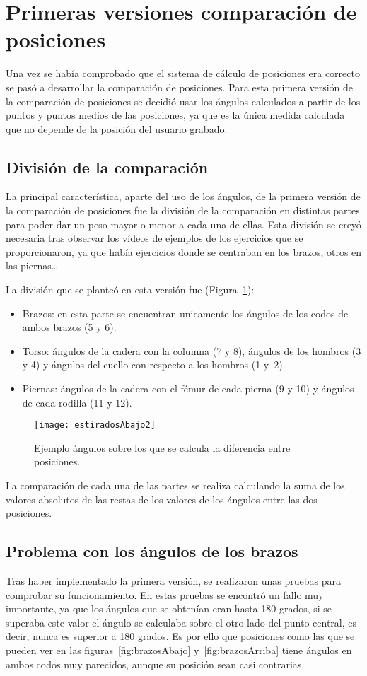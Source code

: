 {\section{Primeras versiones comparación de posiciones} \label{PrimeraVersion}
Una vez se había comprobado que el sistema de cálculo de posiciones era correcto se pasó a desarrollar la comparación de posiciones. Para esta primera versión de la comparación de posiciones se decidió usar los ángulos calculados a partir de los puntos y puntos medios de las posiciones, ya que es la única medida calculada que no depende de la posición del usuario grabado.
\subsection{División de la comparación}
La principal característica, aparte del uso de los ángulos, de la primera versión de la comparación de posiciones fue la división de la comparación en distintas partes para poder dar un peso mayor o menor a cada una de ellas. Esta división se creyó necesaria tras observar los vídeos de ejemplos de los ejercicios que se proporcionaron, ya que había ejercicios donde se centraban en los brazos, otros en las piernas\ldots

La división que se planteó en esta versión fue (Figura~\ref{fig:estiradosAbajo2}):
\begin{itemize}
	\item Brazos: en esta parte se encuentran unicamente los ángulos de los codos de ambos brazos (5 y 6).
	\item Torso: ángulos de la cadera con la columna (7 y 8), ángulos de los hombros (3 y 4) y ángulos del cuello con respecto a los hombros (1 y~2).
	\item Piernas: ángulos de la cadera con el fémur de cada pierna (9 y 10) y ángulos de cada rodilla (11 y 12).
\end{itemize}

\begin{figure}[h]
	\centering
	\texttt{[image: estiradosAbajo2]}
	\caption{Ejemplo ángulos sobre los que se calcula la diferencia entre posiciones.}
	\label{fig:estiradosAbajo2}
\end{figure}

La comparación de cada una de las partes se realiza calculando la suma de los valores absolutos de las restas de los valores de los ángulos entre las dos posiciones.

\subsection{Problema con los ángulos de los brazos}
Tras haber implementado la primera versión, se realizaron unas pruebas para comprobar su funcionamiento. En estas pruebas se encontró un fallo muy importante, ya que los ángulos que se obtenían eran hasta 180 grados, si se superaba este valor el ángulo se calculaba sobre el otro lado del punto central, es decir, nunca es superior a 180 grados. Es por ello que  posiciones como las que se pueden ver en las figuras~\ref{fig:brazosAbajo} y~\ref{fig:brazosArriba} tiene ángulos en ambos codos muy parecidos, aunque su posición sean casi contrarias.

}
